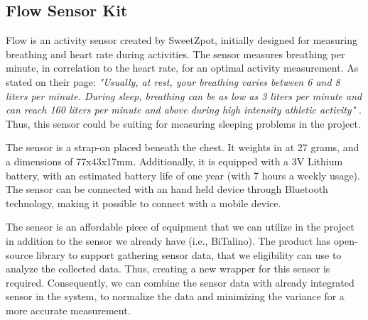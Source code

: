 


\subsection{Flow Sensor Kit}
Flow is an activity sensor created by SweetZpot, initially designed for measuring breathing and heart rate during activities. The sensor measures breathing per minute, in correlation to the heart rate, for an optimal activity measurement. As stated on their page: \textit{"Usually, at rest, your breathing varies between 6 and 8 liters per minute. During sleep, breathing can be as low as 3 liters per minute and can reach 160 liters per minute and above during high intensity athletic activity"} \cite{flow}. Thus, this sensor could be suiting for measuring sleeping problems in the project.

The sensor is a  strap-on placed beneath the chest. It weights in at 27 grams, and a dimensions of 77x43x17mm. Additionally, it is equipped with a 3V Lithium battery, with an estimated battery life of one year (with 7 hours a weekly usage). The sensor can be connected with an hand held device through Bluetooth technology, making it possible to connect with a mobile device.

The sensor is an affordable piece of equipment that we can utilize in the project in addition to the sensor we already have (i.e., BiTalino). The product has open-source library to support gathering sensor data, that we eligibility can use to analyze the collected data. Thus, creating a new wrapper for this sensor is required. Consequently, we can combine the sensor data with already integrated sensor in the system, to normalize the data and minimizing the variance for a more accurate measurement. 

